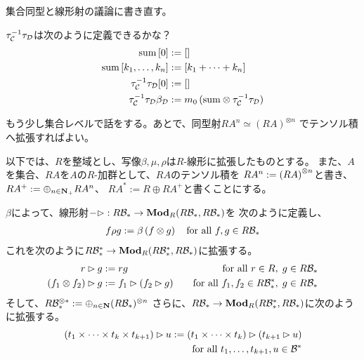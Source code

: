 {	\begin{todo}[線形化]\label{todo:線形化} %
		集合同型と線形射の議論に書き直す。
	\end{todo} %

	\begin{todo}[文字列の変換]\label{todo:文字列の変換} %
		$\tau_{\mathcal{C}}^{-1}\tau_{\mathcal{D}}$は次のように定義できるかな？
		\begin{equation*}\begin{split}
			\mathinner{\operatorname{sum}}{\mathinner{\left[{0}\right]}} &:= {\mathinner{\left[{}\right]}} \\
			\mathinner{\operatorname{sum}}{\mathinner{\left[{k_1,\dots,k_n}\right]}} &:= {\mathinner{\left[{k_1+\cdots+k_n}\right]}} \\
			\tau_{\mathcal{C}}^{-1}\tau_{\mathcal{D}}{\mathinner{\left[{0}\right]}} &:= {\mathinner{\left[{}\right]}} \\
			\tau_{\mathcal{C}}^{-1}\tau_{\mathcal{D}}\beta_{\mathcal{D}}
			&:= m_0\mathinner{({\mathinner{\operatorname{sum}}\otimes \tau_{\mathcal{C}}^{-1}\tau_{\mathcal{D}}})} \\
		\end{split}\end{equation*}
	\end{todo} %

	\begin{todo}[集合]\label{todo:集合} %
		もう少し集合レベルで話をする。あとで、同型射$RA^n\simeq(RA)^{\otimes n}$
		でテンソル積へ拡張すればよい。
	\end{todo} %

	以下では、$R$を整域とし、写像$\beta,\mu,\rho$は$R$-線形に拡張したものとする。
	また、$A$を集合、$RA$を$A$の$R$-加群として、$RA$のテンソル積を
	$RA^n:=\mathinner{({RA})}^{\otimes n}$と書き、$RA^+:=\oplus_{n\in\mathbf{N}_+}RA^n$、
	$RA^*:=R\oplus RA^+$と書くことにする。

	$\beta$によって、線形射$-\rhd:R{\mathcal{B}}_*\to{\mathbf{Mod}}_R(R{\mathcal{B}}_*,R{\mathcal{B}}_*)$を
	次のように定義し、
	\begin{equation*}\begin{split}
		f\rho g := \beta\mathinner{({f\otimes g})} \quad\text{for all } f,g\in R{\mathcal{B}}_*
	\end{split}\end{equation*}
	これを次のように$R{\mathcal{B}}_*^*\to{\mathbf{Mod}}_R(R{\mathcal{B}}_*^*,R{\mathcal{B}}_*)$に拡張する。
	\begin{alignat*}{2}
		r\rhd g &:= rg &\quad\text{for all } r\in R,\; g\in R{\mathcal{B}}_* \\
		\mathinner{({f_1\otimes f_2})}\rhd g &:= f_1\rhd\mathinner{({f_2\rhd g})}
			&\quad\text{for all } f_1,f_2\in R{\mathcal{B}}_*^*,\; g\in R{\mathcal{B}}_*
	\end{alignat*}
	そして、$R{\mathcal{B}}_*^{\otimes*}:=\oplus_{n\in\mathbf{N}}(R{\mathcal{B}}_*)^{\otimes n}$
	さらに、$R{\mathcal{B}}_*\to{\mathbf{Mod}}_R(R{\mathcal{B}}_*^*,R{\mathcal{B}}_*)$に次のように拡張する。
	\begin{equation*}\begin{split}
		\mathinner{({t_1\times\cdots\times t_k\times t_{k+1}})}\rhd u
		:= \mathinner{({t_1\times\cdots\times t_k})}\rhd\mathinner{({t_{k+1}\rhd u})} \\
		\quad\text{for all } t_1,\dots,t_{k+1},u\in{\mathcal{B}}^*
	\end{split}\end{equation*}

}
